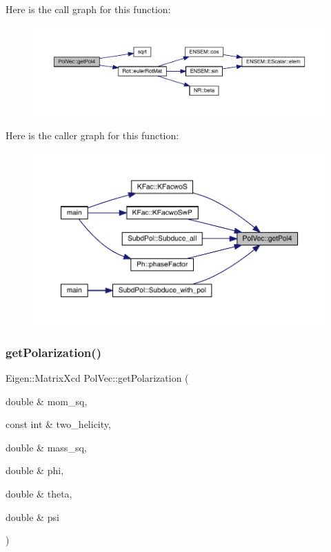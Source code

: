 Here is the call graph for this function\+:
\nopagebreak
\begin{figure}[H]
\begin{center}
\leavevmode
\includegraphics[width=350pt]{d7/d0c/namespacePolVec_a893f95fc9856b40243deeba6939e5318_cgraph}
\end{center}
\end{figure}
Here is the caller graph for this function\+:
\nopagebreak
\begin{figure}[H]
\begin{center}
\leavevmode
\includegraphics[width=350pt]{d7/d0c/namespacePolVec_a893f95fc9856b40243deeba6939e5318_icgraph}
\end{center}
\end{figure}
\mbox{\label{namespacePolVec_a068ffc885b3c06caa2c662b8887c0891}} 
\subsubsection{\texorpdfstring{getPolarization()}{getPolarization()}}
{\footnotesize\ttfamily Eigen\+::\+Matrix\+Xcd Pol\+Vec\+::get\+Polarization (\begin{DoxyParamCaption}\item[{double \&}]{mom\+\_\+sq,  }\item[{const int \&}]{two\+\_\+helicity,  }\item[{double \&}]{mass\+\_\+sq,  }\item[{double \&}]{phi,  }\item[{double \&}]{theta,  }\item[{double \&}]{psi }\end{DoxyParamCaption})}

